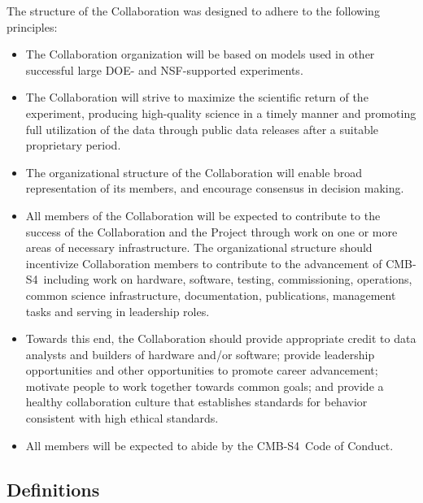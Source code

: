 \documentclass[12pt]{article}
\newcommand\collabname{CMB-S4}
\begin{document}
 The structure of the Collaboration was designed to adhere to the following principles:

\begin{itemize}
\item The Collaboration organization will be based on models used in other successful  large DOE- and NSF-supported experiments.

\item The Collaboration will strive to maximize the scientific return of the experiment, producing high-quality science in a timely manner and promoting full utilization of the data through public data releases after a suitable proprietary period.

\item The organizational structure of the Collaboration will enable broad representation of its members, and encourage consensus in decision making.

\item All members of the Collaboration will be expected to contribute to the success of the Collaboration and the Project through work on one or more areas of necessary infrastructure. The organizational structure should incentivize Collaboration members to contribute to the advancement of \collabname\  including work on hardware, software, testing, commissioning, operations, common science infrastructure, documentation,  publications,  management tasks and serving in leadership roles.

\item Towards this end, the Collaboration should provide appropriate credit to data analysts and builders of hardware and/or software; provide leadership opportunities and other opportunities to promote career advancement; motivate people to work together towards common goals; and provide a healthy collaboration culture that establishes standards for behavior consistent with high ethical standards.

\item All members will be expected to abide by the \collabname\ Code of Conduct.

\end{itemize}

\subsection{Definitions}
\end{document}
